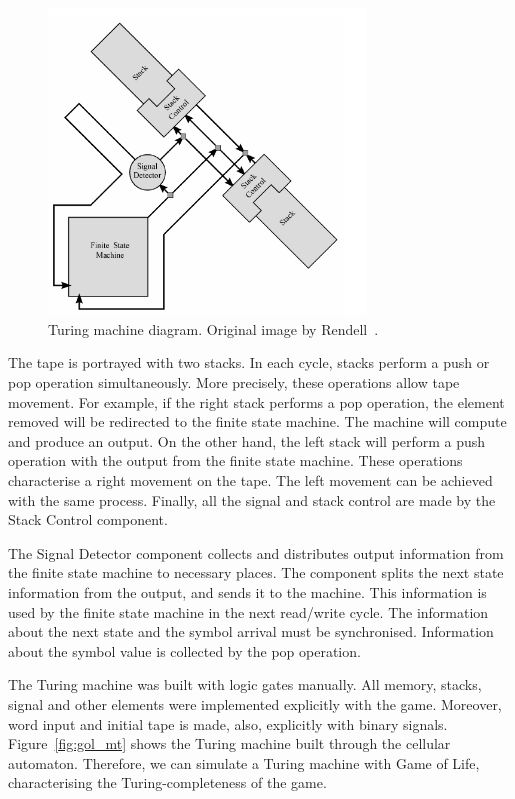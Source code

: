 \documentclass[12pt]{article}
\begin{document}
\begin{figure}[h]
    \centering
    \includegraphics[width=0.75\textwidth]{images/gol-tm-high.pdf}
    \caption{Turing machine diagram. Original image by
        Rendell~\cite{Rendell:inproc:2011:jul}.}\label{fig:gol_mt_highlevel}
\end{figure}

The tape is portrayed with two stacks. In each cycle, stacks perform a push or
pop operation simultaneously. More precisely, these operations allow tape
movement. For example, if the right stack performs a pop operation, the element
removed will be redirected to the finite state machine. The machine will
compute and produce an output. On the other hand, the left stack will perform a
push operation with the output from the finite state machine. These operations
characterise a right movement on the tape. The left movement can be achieved
with the same process. Finally, all the signal and stack control are made by
the Stack Control component.

The Signal Detector component collects and distributes output information from
the finite state machine to necessary places. The component splits the next
state information from the output, and sends it to the machine. This
information is used by the finite state machine in the next read/write cycle.
The information about the next state and the symbol arrival must be
synchronised. Information about the symbol value is collected by the pop
operation.

The Turing machine was built with logic gates manually. All memory, stacks,
signal and other elements were implemented explicitly with the game. Moreover,
word input and initial tape is made, also, explicitly with binary signals.
Figure~\ref{fig:gol_mt} shows the Turing machine built through the cellular
automaton. Therefore, we can simulate a Turing machine with Game of Life,
characterising the Turing-completeness of the game.
\end{document}
